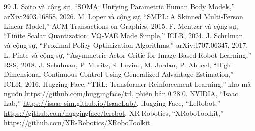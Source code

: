 \documentclass[12pt,a4paper,oneside]{report}
\begin{document}
\begin{thebibliography}{99}
 J. Saito và cộng sự, ``SOMA: Unifying Parametric Human Body Models,'' arXiv:2603.16858, 2026.
 M. Loper và cộng sự, ``SMPL: A Skinned Multi-Person Linear Model,'' ACM Transactions on Graphics, 2015.
 F. Mentzer và cộng sự, ``Finite Scalar Quantization: VQ-VAE Made Simple,'' ICLR, 2024.
 J. Schulman và cộng sự, ``Proximal Policy Optimization Algorithms,'' arXiv:1707.06347, 2017.
 L. Pinto và cộng sự, ``Asymmetric Actor Critic for Image-Based Robot Learning,'' RSS, 2018.
 J. Schulman, P. Moritz, S. Levine, M. Jordan, P. Abbeel, ``High-Dimensional Continuous Control Using Generalized Advantage Estimation,'' ICLR, 2016.
 Hugging Face, ``TRL: Transformer Reinforcement Learning,'' kho mã nguồn \url{https://github.com/huggingface/trl}, phiên bản 0.28.0.
 NVIDIA, ``Isaac Lab,'' \url{https://isaac-sim.github.io/IsaacLab/}.
 Hugging Face, ``LeRobot,'' \url{https://github.com/huggingface/lerobot}.
 XR-Robotics, ``XRoboToolkit,'' \url{https://github.com/XR-Robotics/XRoboToolkit}.
\end{thebibliography}
\end{document}
